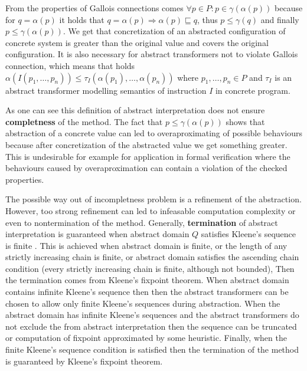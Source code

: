 \documentclass[a4paper, 12pt]{article}
\newcommand{\aord}[0]{\sqsubseteq}
\newcommand{\cord}[0]{\leq}
\newcommand{\adom}[0]{Q}
\newcommand{\aitem}[0]{q}
\newcommand{\cdom}[0]{P}
\newcommand{\citem}[0]{p}
\newcommand{\atrans}[0]{\tau}
\newcommand{\afun}[0]{\alpha}
\newcommand{\cfun}[0]{\gamma}
\begin{document}
From the properties of Gallois connections comes
$\forall \citem \in \cdom: \citem \in \cfun(\afun(\citem))$
because for $q = \afun(\citem)$ it holds that $\aitem = \afun(\citem) \Rightarrow
\alpha(\citem) \aord \aitem$, thus $\citem \cord \cfun(\aitem)$ and finally
$\citem \cord \cfun(\afun(\citem))$.
We get that concretization of an abstracted configuration of concrete system
is greater than the original value and covers the original configuration.
It is also necessary for abstract transformers not to violate Gallois connection,
which means that holds $\alpha(I(\citem_1,\ldots,\citem_n)) \cord \atrans_I(\alpha(\citem_1),\ldots, \alpha(\citem_n))$
where $\citem_1,\ldots,\citem_n \in \cdom$ and $\atrans_I$ is an abstract transformer
modelling semantics of instruction $I$ in concrete program.


As one can see this definition of abstract interpretation
does not ensure \textbf{completness} of the method.
The fact that $\citem \cord \cfun(\afun(\citem))$ shows
that abstraction of a concrete value can led to overaproximating of
possible behaviours because after concretization of the abstracted
value we get something greater.
This is undesirable for example for application in formal verification
where the behaviours caused by overaproximation can contain a violation
of the checked properties.

The possible way out of incompletness problem is a refinement of the abstraction.
However, too strong refinement can led to infeasable computation complexity
or even to nontermination of the method.
Generally, \textbf{termination} of abstract interpretation is guaranteed
when abstract domain $\adom$ satisfies Kleene's sequence is finite \cite{popl77}.
This is achieved when abstract domain is finite, or the length of any strictly
increasing chain is finite, or abstract domain satisfies the ascending chain
condition (every strictly increasing chain is finite, although not bounded),
Then the termination comes from Kleene's fixpoint theorem.
When abstract domain contains infinite Kleene's sequence then
then the abstract transformers can be chosen to allow only finite
Kleene's sequences during abstraction.
When the abstract domain has infinite Kleene's sequences and
the abstract transformers do not exclude the from abstract
interpretation then the sequence can be truncated or computation
of fixpoint approximated by some heuristic.
Finally, when the finite Kleene's sequence condition is
satisfied then the termination of the method is guaranteed
by Kleene's fixpoint theorem.
\end{document}
